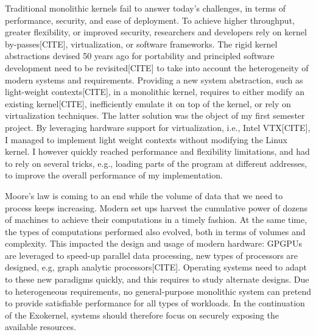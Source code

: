 Traditional monolithic kernels fail to answer today's challenges, in terms of performance, security, and ease of deployment.
To achieve higher throughput, greater flexibility, or improved security, researchers and developers rely on kernel by-passes[CITE], virtualization, or software frameworks.
The rigid kernel abstractions devised 50 years ago for portability and principled software development need to be revisited[CITE] to take into account the heterogeneity of modern systems and requirements.
Providing a new system abstraction, such as light-weight contexts[CITE], in a monolithic kernel, requires to either modify an existing kernel[CITE], inefficiently emulate it on top of the kernel, or rely on virtualization techniques.
The latter solution was the object of my first semester project.
By leveraging hardware support for virtualization, i.e., Intel VTX[CITE], I managed to implement light weight contexts without modifying the Linux kernel.
I however quickly reached performance and flexibility limitations, and had to rely on several tricks, e.g., loading parts of the program at different addresses, to improve the overall performance of my implementation.

%
Moore's law is coming to an end while the volume of data that we need to process keeps increasing.
Modern set ups harvest the cumulative power of dozens of machines to achieve their computations in a timely fashion.
At the same time, the types of computations performed also evolved, both in terms of volumes and complexity.
This impacted the design and usage of modern hardware: GPGPUs are leveraged to speed-up parallel data processing, new types of processors are designed, e.g, graph analytic processors[CITE].
Operating systems need to adapt to these new paradigms quickly, and this requires to study alternate designs.
Due to heterogeneous requirements, no general-purpose monolithic system can pretend to provide satisfiable performance for all types of workloads.
In the continuation of the Exokernel, systems should therefore focus on securely exposing the available resources.

